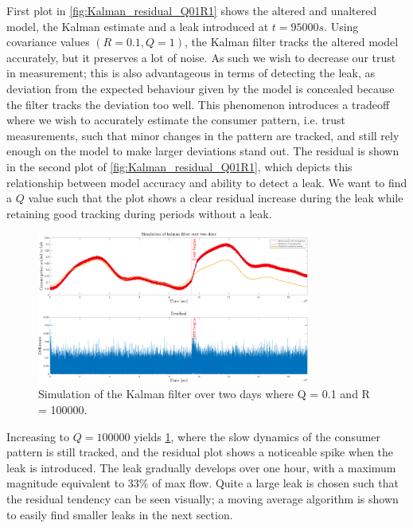 First plot in \cref{fig:Kalman_residual_Q01R1} shows the altered and unaltered model, the Kalman estimate and a leak introduced at $t = 95000\si{s}$. Using covariance values $(R = 0.1, Q = 1)$, the Kalman filter tracks the altered model accurately, but it preserves a lot of noise. As such we wish to decrease our trust in measurement; this is also advantageous in terms of detecting the leak, as deviation from the expected behaviour given by the model is concealed because the filter tracks the deviation too well. This phenomenon introduces a tradeoff where we wish to accurately estimate the consumer pattern, i.e. trust measurements, such that minor changes in the pattern are tracked, and still rely enough on the model to make larger deviations stand out. The residual is shown in the second plot of \cref{fig:Kalman_residual_Q01R1}, which depicts this relationship between model accuracy and ability to detect a leak. We want to find a $Q$ value such that the plot shows a clear residual increase during the leak while retaining good tracking during periods without a leak. 

\begin{figure}[h!]
	\centering
	\includegraphics[width=0.8\textwidth]{Pictures/Kalman_and_Residual_Q01_R100000.pdf}
	
	\caption{Simulation of the Kalman filter over two days where Q = 0.1 and R = 100000.}
	\label{fig:Kalman_residual_Q01R100000}
\end{figure}

Increasing to $Q = 100000$ yields \cref{fig:Kalman_residual_Q01R100000}, where the slow dynamics of the consumer pattern is still tracked, and the residual plot shows a noticeable spike when the leak is introduced. The leak gradually develops over one hour, with a maximum magnitude equivalent to $33\%$ of max flow. Quite a large leak is chosen such that the residual tendency can be seen visually; a moving average algorithm is shown to easily find smaller leaks in the next section. 

